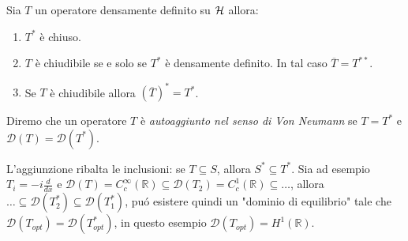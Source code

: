 \begin{theorem}
    Sia $T$ un operatore densamente definito su $\operatorname{\mathcal{H}}$ allora: 
\begin{enumerate}
    \item $T^*$ è chiuso.
    \item $T$ è chiudibile se e solo se $T^*$ è densamente definito. In tal caso $\overline{T} = T^{**}$.
    \item Se $T$ è chiudibile allora $(\overline{T})^* = T^*$.
\end{enumerate}
\end{theorem}

\begin{definition}
    Diremo che un operatore $T$ è \emph{autoaggiunto nel senso di Von Neumann} se $T = T^*$ e $\mathcal{D}(T) = \mathcal{D}(T^*)$.
\end{definition}

\begin{observation}
L'aggiunzione ribalta le inclusioni: se $T \subseteq S$, allora $S^* \subseteq T^*$. Sia ad esempio $T_i = -i \frac{d}{dx}$ e $\mathcal{D}(T) = C_c^\infty(\mathbb{R})\subseteq \mathcal{D}(T_2) = C_c^1(\mathbb{R} ) \subseteq \dots $, allora $\dots \subseteq \mathcal{D}(T^*_2) \subseteq \mathcal{D}(T^*_1)$, puó esistere quindi un "dominio di equilibrio" tale che $\mathcal{D}(T_{opt})=\mathcal{D}(T^*_{opt})$, in questo esempio $\mathcal{D}(T_{opt}) = H^1(\mathbb{R})$.
\end{observation}   


